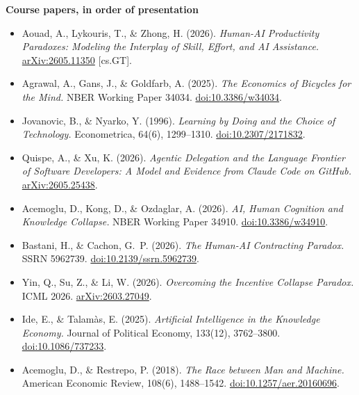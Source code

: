 \documentclass[11pt]{article}
\begin{document}
\textbf{Course papers, in order of presentation}
\begin{itemize}
\item Aouad, A., Lykouris, T., \& Zhong, H. (2026). \emph{Human-AI Productivity Paradoxes: Modeling the Interplay of Skill, Effort, and AI Assistance.} \href{https://arxiv.org/abs/2605.11350}{arXiv:2605.11350} [cs.GT].
\item Agrawal, A., Gans, J., \& Goldfarb, A. (2025). \emph{The Economics of Bicycles for the Mind.} NBER Working Paper 34034. \href{https://doi.org/10.3386/w34034}{doi:10.3386/w34034}.
\item Jovanovic, B., \& Nyarko, Y. (1996). \emph{Learning by Doing and the Choice of Technology.} Econometrica, 64(6), 1299--1310. \href{https://doi.org/10.2307/2171832}{doi:10.2307/2171832}.
\item Quispe, A., \& Xu, K. (2026). \emph{Agentic Delegation and the Language Frontier of Software Developers: A Model and Evidence from Claude Code on GitHub.} \href{https://arxiv.org/abs/2605.25438}{arXiv:2605.25438}.
\item Acemoglu, D., Kong, D., \& Ozdaglar, A. (2026). \emph{AI, Human Cognition and Knowledge Collapse.} NBER Working Paper 34910. \href{https://doi.org/10.3386/w34910}{doi:10.3386/w34910}.
\item Bastani, H., \& Cachon, G.~P. (2026). \emph{The Human-AI Contracting Paradox.} SSRN 5962739. \href{https://doi.org/10.2139/ssrn.5962739}{doi:10.2139/ssrn.5962739}.
\item Yin, Q., Su, Z., \& Li, W. (2026). \emph{Overcoming the Incentive Collapse Paradox.} ICML 2026. \href{https://arxiv.org/abs/2603.27049}{arXiv:2603.27049}.
\item Ide, E., \& Talam\`as, E. (2025). \emph{Artificial Intelligence in the Knowledge Economy.} Journal of Political Economy, 133(12), 3762--3800. \href{https://doi.org/10.1086/737233}{doi:10.1086/737233}.
\item Acemoglu, D., \& Restrepo, P. (2018). \emph{The Race between Man and Machine.} American Economic Review, 108(6), 1488--1542. \href{https://doi.org/10.1257/aer.20160696}{doi:10.1257/aer.20160696}.
\end{itemize}
\end{document}
